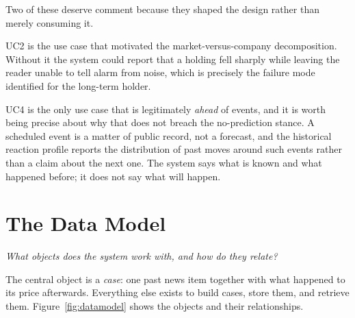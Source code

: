 Two of these deserve comment because they shaped the design rather than merely consuming it.

UC2 is the use case that motivated the market-versus-company decomposition. Without it the system
could report that a holding fell sharply while leaving the reader unable to tell alarm from noise,
which is precisely the failure mode identified for the long-term holder.

UC4 is the only use case that is legitimately \emph{ahead} of events, and it is worth being precise
about why that does not breach the no-prediction stance. A scheduled event is a matter of public
record, not a forecast, and the historical reaction profile reports the distribution of past moves
around such events rather than a claim about the next one. The system says what is known and what
happened before; it does not say what will happen.

\section{The Data Model}
\label{sec:investigator_datamodel}

\emph{What objects does the system work with, and how do they relate?}

The central object is a \emph{case}: one past news item together with what happened to its price afterwards.
Everything else exists to build cases, store them, and retrieve them. Figure~\ref{fig:datamodel} shows the
objects and their relationships.

